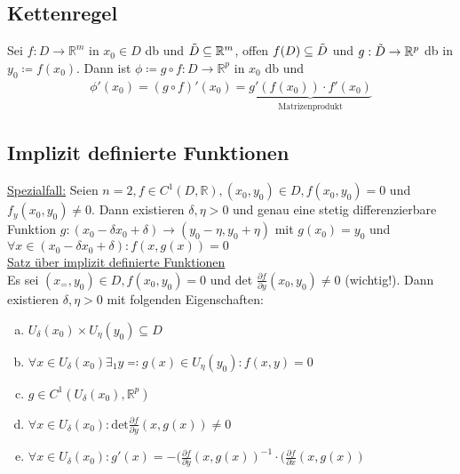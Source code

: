 \documentclass{article}
\begin{document}
\subsection{Kettenregel}
Sei $f: D \to \mathbb{R}^m$ in $x_0 \in D$ db und $\Tilde{D} \subseteq \mathbb{R}^m$, offen $f(D) \subseteq \Tilde{D}$ und $g: \Tilde{D} \to \mathbb{R}^p$ db
in $y_0 \coloneqq f(x_0)$. Dann ist  $\phi \coloneqq g\circ f: D \to \mathbb{R}^p$ in $x_0$ db und 
\begin{align*}
    \phi'(x_0) = (g \circ f)'(x_0) = \underbrace{g'(f(x_0)) \cdot f'(x_0)}_{\text{Matrizenprodukt}}
\end{align*}

\subsection{Implizit definierte Funktionen}
\underline{Spezialfall:} Seien $n=2, f\in C^1(D, \mathbb{R}),(x_0,y_0) \in D, f(x_0,y_0)=0$ und $f_y(x_0,y_0) \neq 0$. Dann existieren $\delta,\eta > 0$ und genau eine
stetig differenzierbare Funktion $g: (x_0- \delta x_0 + \delta) \to (y_0 - \eta, y_0 + \eta)$ mit $g(x_0)=y_0$
und $\forall x \in (x_0- \delta x_0 + \delta): f(x,g(x))=0$ \\
\underline{Satz über implizit definierte Funktionen} \\
Es sei $(x_=,y_0) \in D, f(x_0,y_0) = 0$ und det $\frac{\partial f}{\partial y}(x_0,y_0) \neq 0$ (wichtig!). Dann existieren $\delta,\eta > 0$ mit folgenden
Eigenschaften:
\begin{enumerate} [a)]
    \item $U_\delta (x_0) \times U_\eta (y_0) \subseteq D$
    \item $\forall x \in U_\delta(x_0) \exists_1 y \eqqcolon g(x) \in U_\eta(y_0): f(x,y)=0$
    \item $g \in C^1(U_\delta(x_0),\mathbb{R}^p)$
    \item $\forall x \in U_\delta(x_0): \text{det} \frac{\partial f}{\partial y}(x,g(x)) \neq 0$
    \item $\forall x \in U_\delta(x_0): g'(x)=-(\frac{\partial f}{\partial y}(x,g(x))^{-1} \cdot (\frac{\partial f}{\partial x}(x,g(x))$
\end{enumerate}
\end{document}
